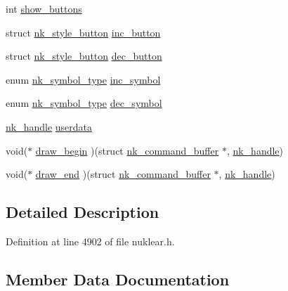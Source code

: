 \begin{DoxyCompactItemize}
\item 
int \mbox{\hyperlink{structnk__style__scrollbar_a446fa57c29033ddc7c960c83bee454fb}{show\+\_\+buttons}}
\item 
struct \mbox{\hyperlink{structnk__style__button}{nk\+\_\+style\+\_\+button}} \mbox{\hyperlink{structnk__style__scrollbar_a3184981c83202a1633f77a6fa224ff98}{inc\+\_\+button}}
\item 
struct \mbox{\hyperlink{structnk__style__button}{nk\+\_\+style\+\_\+button}} \mbox{\hyperlink{structnk__style__scrollbar_a2f691b18296736c36da1e52295c87909}{dec\+\_\+button}}
\item 
enum \mbox{\hyperlink{nuklear_8h_a29b4aaa400d0ce28aea3c8c9c372ac07}{nk\+\_\+symbol\+\_\+type}} \mbox{\hyperlink{structnk__style__scrollbar_ae880b936bb999860f48aeb9ab52e6a93}{inc\+\_\+symbol}}
\item 
enum \mbox{\hyperlink{nuklear_8h_a29b4aaa400d0ce28aea3c8c9c372ac07}{nk\+\_\+symbol\+\_\+type}} \mbox{\hyperlink{structnk__style__scrollbar_ab6cfc79e1425a8eb0ec7839dac348e44}{dec\+\_\+symbol}}
\item 
\mbox{\hyperlink{unionnk__handle}{nk\+\_\+handle}} \mbox{\hyperlink{structnk__style__scrollbar_a9ffd74fad1ee2f9b293693ebd77f1110}{userdata}}
\item 
void($\ast$ \mbox{\hyperlink{structnk__style__scrollbar_a71b634a194cacf873ba06c5010b7d154}{draw\+\_\+begin}} )(struct \mbox{\hyperlink{structnk__command__buffer}{nk\+\_\+command\+\_\+buffer}} $\ast$, \mbox{\hyperlink{unionnk__handle}{nk\+\_\+handle}})
\item 
void($\ast$ \mbox{\hyperlink{structnk__style__scrollbar_aa89c7f391ccb04c1d2c1e6a1fc5434c9}{draw\+\_\+end}} )(struct \mbox{\hyperlink{structnk__command__buffer}{nk\+\_\+command\+\_\+buffer}} $\ast$, \mbox{\hyperlink{unionnk__handle}{nk\+\_\+handle}})
\end{DoxyCompactItemize}


\subsection{Detailed Description}


Definition at line 4902 of file nuklear.\+h.



\subsection{Member Data Documentation}
\mbox{\label{structnk__style__scrollbar_a9573ba744345893dca5cc83e0114dad5}} 
